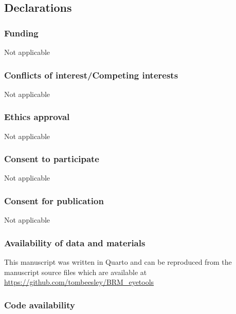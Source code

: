 \documentclass[
  man,
  floatsintext,
  longtable,
  nolmodern,
  notxfonts,
  notimes,
  colorlinks=true,linkcolor=blue,citecolor=blue,urlcolor=blue]{apa7}
\begin{document}
\subsection{Declarations}\label{declarations}

\subsubsection{Funding}\label{funding}

Not applicable

\subsubsection{Conflicts of interest/Competing
interests}\label{conflicts-of-interestcompeting-interests}

Not applicable

\subsubsection{Ethics approval}\label{ethics-approval}

Not applicable

\subsubsection{Consent to participate}\label{consent-to-participate}

Not applicable

\subsubsection{Consent for publication}\label{consent-for-publication}

Not applicable

\subsubsection{Availability of data and
materials}\label{availability-of-data-and-materials}

This manuscript was written in Quarto and can be reproduced from the
manuscript source files which are available at
\url{https://github.com/tombeesley/BRM_eyetools}

\subsubsection{Code availability}\label{code-availability}
\end{document}
